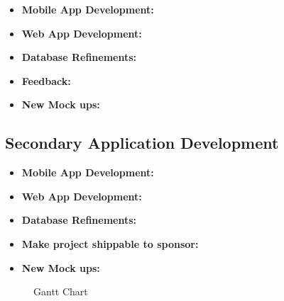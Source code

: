 \documentclass[Letter,11pt]{article}
\begin{document}
		\begin{itemize}
			\item\textbf{Mobile App Development:}\\
			
			\item \textbf{Web App Development:}\\
			
			\item\textbf{Database Refinements:}\\
			
			\item\textbf{Feedback:}\\
			
			\item\textbf{New Mock ups:}\\
			
		\end{itemize}
		
	\subsection{Secondary Application Development}\label{dev2}
		
		\begin{itemize}
			\item\textbf{Mobile App Development:}\\
			
			\item \textbf{Web App Development:}\\
			
			
			\item\textbf{Database Refinements:}\\
			
			\item\textbf{Make project shippable to sponsor:}\\
			
			\item\textbf{New Mock ups:}\\
			
		\end{itemize}
		
		\begin{landscape}
			\begin{figure}
				
				\caption{\label{fig:gant}Gantt Chart}
			\end{figure}
		\end{landscape}
	
\end{document}
